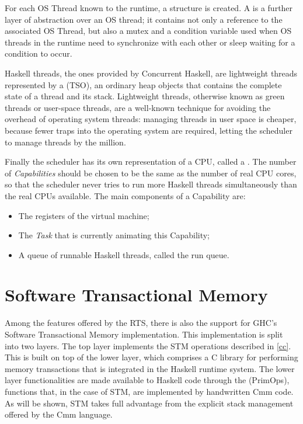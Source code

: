 For each OS Thread known to the runtime, a  structure is created. A  is a further layer of abstraction over an OS thread; it contains not only a reference to the associated OS Thread, but also a mutex and a condition variable used when OS threads in the runtime need to synchronize with each other or sleep waiting for a condition to occur.

Haskell threads, the ones provided by Concurrent Haskell, are lightweight threads represented by a  (TSO), an ordinary heap objects that contains the complete state of a thread and its stack.
Lightweight threads, otherwise known as green threads or user-space threads,
are a well-known technique for avoiding the overhead of operating system threads: managing threads in user space is cheaper, because fewer traps into the operating system are required, letting the scheduler to manage threads by the million.

Finally the scheduler has its own representation of a CPU, called a . The number of \emph{Capabilities} should be  chosen to be the same as the number of real CPU cores, so that the scheduler never tries to run more Haskell threads simultaneously than the real CPUs available.
The main components of a Capability are:
\begin{itemize}
\item The registers of the virtual machine;
\item The \emph{Task} that is currently animating this Capability;
\item A queue of runnable Haskell threads, called the run queue.
\end{itemize}

\section{Software Transactional Memory}
Among the features offered by the RTS, there is also the support for GHC's Software Transactional Memory implementation.
This implementation is split into two layers.
The top layer implements the STM operations described in \ref{cc}.
This is built on top of the lower layer, which comprises a C library for performing memory transactions that is integrated in the Haskell runtime system.
The lower layer functionalities are made available to Haskell code through the  (PrimOps), \ie functions that, in the case of STM, are implemented by handwritten Cmm code. 
As will be shown, STM takes full advantage from the explicit stack management offered by the Cmm language.

